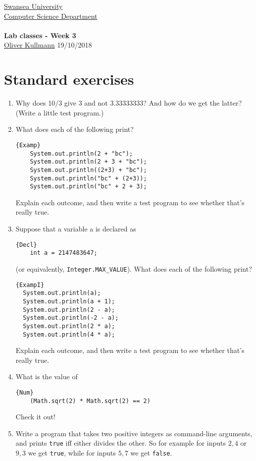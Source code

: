 \documentclass[11pt]{article}
\newcommand{\Java}{\lstset{language=Java,keywordstyle=\bfseries,breaklines,breakindent=30pt}}
\begin{document}
\begin{center}
  \href{http://www.swan.ac.uk/}{Swansea University}\\
  \href{http://www.swan.ac.uk/compsci/}{Computer Science Department}\\[1ex]
  \href{\chp}{\module}\\[1ex]
  \textbf{Lab classes - Week 3}\\
  \href{http://cs.swan.ac.uk/~csoliver}{Oliver Kullmann} 19/10/2018
\end{center}


\section{Standard exercises}
\label{sec:stdex}

\Java

\begin{enumerate}
\item Why does 10/3 give 3 and not 3.33333333? And how do we get the latter? (Write a little test program.)
\item What does each of the following print?
  \begin{lstlisting}{Examp}
    System.out.println(2 + "bc");
    System.out.println(2 + 3 + "bc");
    System.out.println((2+3) + "bc");
    System.out.println("bc" + (2+3));
    System.out.println("bc" + 2 + 3);
  \end{lstlisting}
  Explain each outcome, and then write a test program to see whether that's really true.
\item Suppose that a variable a is declared as
  \begin{lstlisting}{Decl}
    int a = 2147483647;
  \end{lstlisting}
  (or equivalently, \texttt{Integer.MAX\_VALUE}). What does each of the following print?
\begin{lstlisting}{ExampI}
  System.out.println(a);
  System.out.println(a + 1);
  System.out.println(2 - a);
  System.out.println(-2 - a);
  System.out.println(2 * a);
  System.out.println(4 * a);
  \end{lstlisting}
Explain each outcome, and then write a test program to see whether that's really true.
\item What is the value of
  \begin{lstlisting}{Num}
    (Math.sqrt(2) * Math.sqrt(2) == 2)
  \end{lstlisting}
  Check it out!
\item Write a program that takes two positive integers as command-line arguments, and prints \texttt{true} iff either divides the other. So for example for inputs $2,4$ or $9,3$ we get \texttt{true}, while for inputs $5,7$ we get \texttt{false}.
\end{enumerate}
\end{document}

